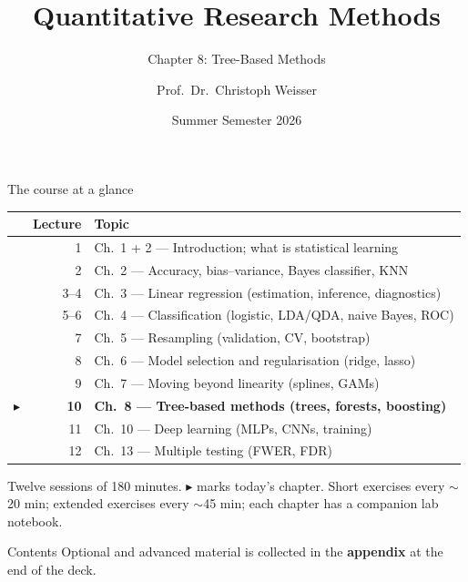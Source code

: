 \documentclass[aspectratio=169,11pt]{beamer}
\title{Quantitative Research Methods}
\subtitle{Chapter 8: Tree-Based Methods}
\author{Prof.\ Dr.\ Christoph Weisser}\institute{HSBI}
\date{Summer Semester 2026}\graphicspath{{images/}}
\begin{document}
\begin{frame}[plain]\titlepage\end{frame}

\begin{frame}{The course at a glance}
  \footnotesize
  \begin{center}
  \begin{tabular}{@{}c r l@{}}
    & \textbf{Lecture} & \textbf{Topic}\\
    \midrule
     & 1 & Ch.\ 1 + 2 --- Introduction; what is statistical learning \\
     & 2 & Ch.\ 2 --- Accuracy, bias--variance, Bayes classifier, KNN \\
     & 3--4 & Ch.\ 3 --- Linear regression (estimation, inference, diagnostics) \\
     & 5--6 & Ch.\ 4 --- Classification (logistic, LDA/QDA, naive Bayes, ROC) \\
     & 7 & Ch.\ 5 --- Resampling (validation, CV, bootstrap) \\
     & 8 & Ch.\ 6 --- Model selection and regularisation (ridge, lasso) \\
     & 9 & Ch.\ 7 --- Moving beyond linearity (splines, GAMs) \\
    $\blacktriangleright$ & \textbf{10} & \textbf{Ch.\ 8 --- Tree-based methods (trees, forests, boosting)} \\
     & 11 & Ch.\ 10 --- Deep learning (MLPs, CNNs, training) \\
     & 12 & Ch.\ 13 --- Multiple testing (FWER, FDR) \\
  \end{tabular}
  \end{center}
  \vspace{2pt}
  {\scriptsize Twelve sessions of 180 minutes. $\blacktriangleright$ marks today's chapter. Short exercises every $\sim$20 min; extended exercises every $\sim$45 min; each chapter has a companion lab notebook.}
\end{frame}


\begin{frame}{Contents}\small
  \tableofcontents[hideallsubsections]
  \vfill
  {\tiny Optional and advanced material is collected in the \textbf{appendix} at the end of the deck.}
\end{frame}
\end{document}
